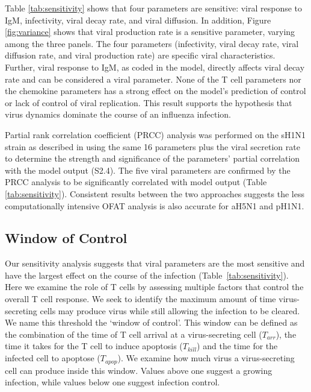 \documentclass[preprint,10pt,numbers]{elsarticle}
\newcommand{\new}[1]{#1}
\begin{document}
Table \ref{tab:sensitivity} shows that four parameters are sensitive: viral response to IgM, infectivity, viral decay rate, and viral diffusion.  In addition, Figure \ref{fig:variance} shows that viral production rate is a sensitive parameter, varying among the three panels.  The four parameters (infectivity, viral decay rate, viral diffusion rate, and viral production rate) are specific viral characteristics.  Further, viral response to IgM, as coded in the model, directly affects viral decay rate and can be considered a viral parameter.  None of the T cell parameters nor the chemokine parameters has a strong effect on the model's prediction of control or lack of control of viral replication.  This result supports the hypothesis that virus dynamics dominate the course of an influenza infection.  

Partial rank correlation coefficient (PRCC) analysis was performed on the sH1N1 strain \new{as described in \cite{Marino2008}} using the same 16 parameters plus the viral secretion rate to determine the strength and significance of the parameters' partial correlation with the model output (S2.4).  The  five viral parameters are confirmed by the PRCC analysis to be significantly correlated with model output (Table \ref{tab:sensitivity}).  Consistent results between the two approaches suggests the less computationally intensive OFAT analysis is also accurate for aH5N1 and pH1N1.

\subsection*{Window of Control}

Our sensitivity analysis suggests that viral parameters are the most sensitive and have the largest effect on the course of the infection (Table~\ref{tab:sensitivity}).  Here we examine the role of T cells by assessing multiple factors that control the overall T cell response.  We seek to identify the maximum amount of time virus-secreting cells may produce virus while still allowing the infection to be cleared.  We name this threshold the `window of control'.  This window can be defined as the combination of the time of T cell arrival at a virus-secreting cell ($T_{arr}$), the time it takes for the T cell to induce apoptosis ($T_{kill}$) and the time for the infected cell to apoptose ($T_{apop}$).  We examine how much virus a virus-secreting cell can produce inside this window.  Values above one suggest a growing infection, while values below one suggest infection control.
\end{document}
